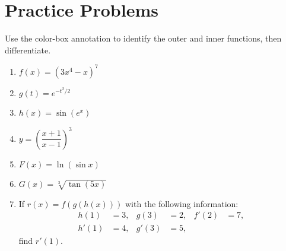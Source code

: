 \documentclass[11pt]{article}
\begin{document}
\section*{Practice Problems}

Use the color-box annotation to identify the outer and inner functions, then differentiate.

\begin{enumerate}[resume]
\item $f(x) = (3x^4 - x)^7$

\item $g(t) = e^{-t^2/2}$

\item $h(x) = \sin(e^x)$

\item $y = \left( \dfrac{x+1}{x-1} \right)^3$

\item $F(x) = \ln(\sin x)$

\item $G(x) = \sqrt[3]{\tan(5x)}$

\item If $r(x) = f(g(h(x)))$ with the following information:
\begin{align*}
  h(1) &= 3, & g(3) &= 2, & f'(2) &= 7, \\
  h'(1) &= 4, & g'(3) &= 5,
\end{align*}
find $r'(1)$.
\end{enumerate}
\end{document}
